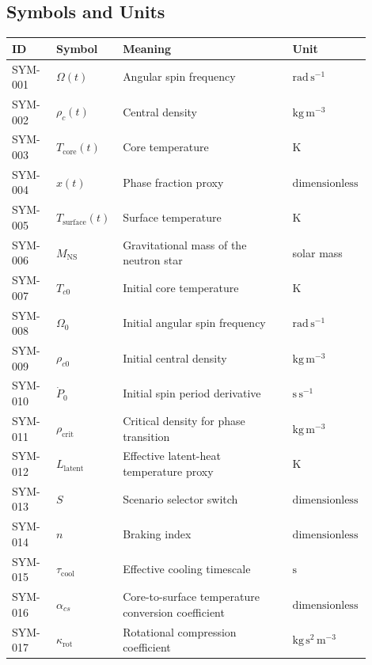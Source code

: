 \documentclass[11pt]{article}
\begin{document}
\subsection{Symbols and Units}

\begin{center}
\small
\begin{tabular}{|p{0.12\linewidth}|p{0.15\linewidth}|p{0.46\linewidth}|p{0.17\linewidth}|}
\hline
ID & Symbol & Meaning & Unit \\ \hline
SYM-001 & $\Omega(t)$ & Angular spin frequency & $\mathrm{rad}\,\mathrm{s}^{-1}$ \\ \hline
SYM-002 & $\rho_c(t)$ & Central density & $\mathrm{kg}\,\mathrm{m}^{-3}$ \\ \hline
SYM-003 & $T_{\mathrm{core}}(t)$ & Core temperature & $\mathrm{K}$ \\ \hline
SYM-004 & $x(t)$ & Phase fraction proxy & $\mathrm{dimensionless}$ \\ \hline
SYM-005 & $T_{\mathrm{surface}}(t)$ & Surface temperature & $\mathrm{K}$ \\ \hline
SYM-006 & $M_{\mathrm{NS}}$ & Gravitational mass of the neutron star & solar mass \\ \hline
SYM-007 & $T_{c0}$ & Initial core temperature & $\mathrm{K}$ \\ \hline
SYM-008 & $\Omega_0$ & Initial angular spin frequency & $\mathrm{rad}\,\mathrm{s}^{-1}$ \\ \hline
SYM-009 & $\rho_{c0}$ & Initial central density & $\mathrm{kg}\,\mathrm{m}^{-3}$ \\ \hline
SYM-010 & $\dot{P}_0$ & Initial spin period derivative & $\mathrm{s}\,\mathrm{s}^{-1}$ \\ \hline
SYM-011 & $\rho_{\mathrm{crit}}$ & Critical density for phase transition & $\mathrm{kg}\,\mathrm{m}^{-3}$ \\ \hline
SYM-012 & $L_{\mathrm{latent}}$ & Effective latent-heat temperature proxy & $\mathrm{K}$ \\ \hline
SYM-013 & $S$ & Scenario selector switch & $\mathrm{dimensionless}$ \\ \hline
SYM-014 & $n$ & Braking index & $\mathrm{dimensionless}$ \\ \hline
SYM-015 & $\tau_{\mathrm{cool}}$ & Effective cooling timescale & $\mathrm{s}$ \\ \hline
SYM-016 & $\alpha_{cs}$ & Core-to-surface temperature conversion coefficient & $\mathrm{dimensionless}$ \\ \hline
SYM-017 & $\kappa_{\mathrm{rot}}$ & Rotational compression coefficient & $\mathrm{kg}\,\mathrm{s}^{2}\,\mathrm{m}^{-3}$ \\ \hline
\end{tabular}
\end{center}
\end{document}
